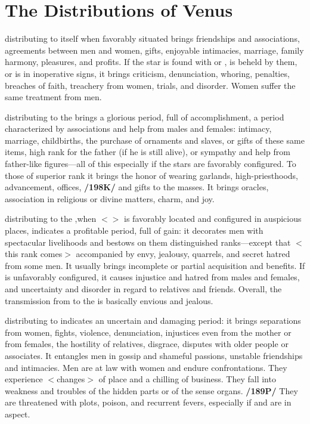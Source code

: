 \section{The Distributions of Venus}

\Venus\xspace distributing to itself when favorably situated brings friendships and associations, agreements between men and women, gifts, enjoyable intimacies, marriage, family harmony, pleasures, and profits. If the star is found with \Saturn\xspace or \Mars, is beheld by them, or is in inoperative signs, it brings criticism, denunciation, whoring, penalties, breaches of faith, treachery from women, trials, and disorder. Women suffer the same treatment from men.

\Venus\xspace distributing to the \Sun\xspace brings a glorious period, full of accomplishment, a period characterized by associations and help from males and females: intimacy, marriage, childbirths, the purchase of ornaments and slaves, or gifts of these same items, high rank for the father (if he is still alive), or sympathy and help from father-like figures—all of this especially if the stars are favorably configured. To those of superior rank it brings the honor of wearing garlands, high-priesthoods, advancement, offices, \textbf{/198K/} and
gifts to the masses. It brings oracles, association in religious or divine matters, charm, and joy.

\Venus\xspace distributing to the \Moon,when $<$\Venus$>$ is favorably located and configured in auspicious places, indicates a profitable period, full of gain: it decorates men with spectacular livelihoods and bestows on them distinguished ranks—except that $<$this rank comes$>$ accompanied by envy, jealousy, quarrels, and secret hatred from some men. It usually brings incomplete or partial acquisition and benefits. If \Venus\xspace is unfavorably configured, it causes injustice and hatred from males and females, and uncertainty and disorder
in regard to relatives and friends. Overall, the transmission from \Venus\xspace to the \Moon\xspace is basically envious and jealous.

\Venus\xspace distributing to \Saturn\xspace indicates an uncertain and damaging period: it brings separations from
women, fights, violence, denunciation, injustices even from the mother or from females, the hostility of relatives, disgrace, disputes with older people or associates. It entangles men in gossip and shameful passions, unstable friendships and intimacies. Men are at law with women and endure confrontations. They experience $<$changes$>$ of place and a chilling of business. They fall into weakness and troubles of the hidden parts or of the sense organs. \textbf{/189P/} They are threatened with plots, poison, and recurrent fevers,
especially if \Mars\xspace and \Mercury\xspace are in aspect.

